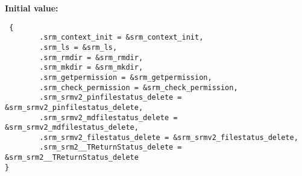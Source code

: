 \textbf{Initial value:}

\begin{Code}\begin{verbatim} { 
        .srm_context_init = &srm_context_init,
        .srm_ls = &srm_ls,
        .srm_rmdir = &srm_rmdir,
        .srm_mkdir = &srm_mkdir,
        .srm_getpermission = &srm_getpermission,
        .srm_check_permission = &srm_check_permission,
        .srm_srmv2_pinfilestatus_delete = &srm_srmv2_pinfilestatus_delete,
        .srm_srmv2_mdfilestatus_delete = &srm_srmv2_mdfilestatus_delete,
        .srm_srmv2_filestatus_delete = &srm_srmv2_filestatus_delete,
        .srm_srm2__TReturnStatus_delete = &srm_srm2__TReturnStatus_delete
}
\end{verbatim}\end{Code}
